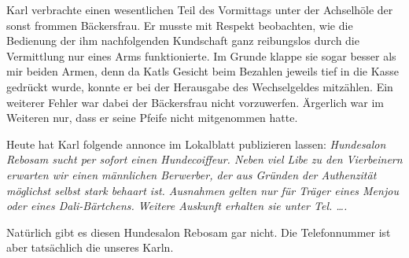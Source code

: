 Karl verbrachte einen wesentlichen Teil des Vormittags unter der Achselhöle der sonst frommen Bäckersfrau. Er musste mit Respekt beobachten, wie die Bedienung der ihm nachfolgenden Kundschaft ganz reibungslos durch die Vermittlung nur eines Arms funktionierte. Im Grunde klappe sie sogar besser als mir beiden Armen, denn da Katls Gesicht beim Bezahlen jeweils tief in die Kasse gedrückt wurde, konnte er bei der Herausgabe des Wechselgeldes mitzählen. Ein weiterer Fehler war dabei der Bäckersfrau nicht vorzuwerfen. Ärgerlich war im Weiteren nur, dass er seine Pfeife nicht mitgenommen hatte.
\begin{center}
{\huge \textthing}
\end{center}
Heute hat Karl folgende annonce im Lokalblatt publizieren lassen: {\it Hundesalon Rebosam sucht per sofort einen Hundecoiffeur. Neben viel Libe zu den Vierbeinern erwarten wir einen männlichen Berwerber, der aus Gründen der Authenzität möglichst selbst stark behaart ist. Ausnahmen gelten nur für Träger eines Menjou oder eines Dali-Bärtchens. Weitere Auskunft erhalten sie unter Tel. \ldots. }

Natürlich gibt es diesen Hundesalon Rebosam gar nicht. Die Telefonnummer ist aber tatsächlich die unseres Karln.
\begin{center}
{\huge \textthing}
\end{center}
\hfill {\color{red}\decofourleft}

